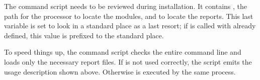 The  command script needs to be reviewed during installation. It
contains , the path for the  processor to locate
the modules, and  to locate the reports. This last variable is
set to look in a standard place as a last resort; if  is called
with  already defined, this value is prefixed to the standard
place.

To speed things up, the command script checks the entire command line and
loads only the necessary report files. If  is not used correctly,
the script emits the usage description shown above. Otherwise  is
executed by the same process.

\newpage{\thispagestyle{empty}\cleardoublepage}

